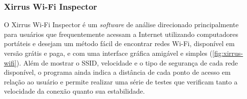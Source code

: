 \begin{figure}[H]
	\centering
\end{figure}

\subsubsection{Xirrus Wi-Fi Inspector}
\label{subsubsec:xirrus-wifi}

O Xirrus Wi-Fi Inspector é um \textit{software} de análise direcionado principalmente para usuários que frequentemente acessam a Internet utilizando computadores portáteis e desejam um método fácil de encontrar redes Wi-Fi, disponível em versão grátis e paga, e com uma interface gráfica amigável e simples (\autoref{fig:xirrus-wifi}). Além de mostrar o SSID, velocidade e o tipo de segurança de cada rede disponível, o programa ainda indica a distância de cada ponto de acesso em relação ao usuário e permite realizar uma série de testes que verificam tanto a velocidade da conexão quanto sua estabilidade.

\begin{figure}[H]
	\centering
\end{figure}